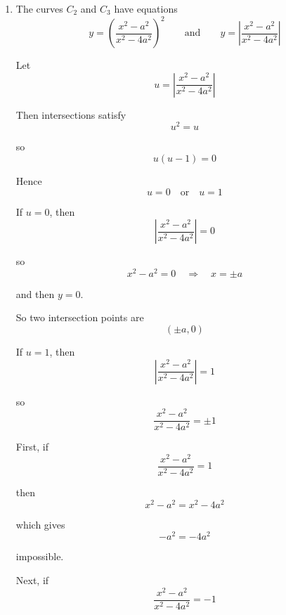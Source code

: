 \documentclass[leqno]{article}
\begin{document}
\begin{enumerate}[
  label=\textbf{\arabic*.},
  leftmargin=*,
  topsep=0pt,
  partopsep=0pt,
  parsep=0pt
]
\begin{djsSolution}
\begin{enumerate}[label=\textbf{(\alph*)}]
\begin{enumerate}[label=(\roman*)]
    So
    \begin{align*}
    g'(x)
    &=2\left(\frac{x^2-a^2}{x^2-4a^2}\right)\left(-\frac{6a^2x}{(x^2-4a^2)^2}\right) \\
    &=-\frac{12a^2x(x^2-a^2)}{(x^2-4a^2)^3}
    \end{align*}

    Stationary points occur when $g'(x)=0$, so
    \[
    -12a^2x(x^2-a^2)=0
    \]

    Hence
    \[
    x=0 \quad \text{or} \quad x^2=a^2\quad\Longrightarrow\quad x=\pm a
    \]

    Now find the corresponding $y$-coordinates:
    \[
    g(0)=\left(\frac{-a^2}{-4a^2}\right)^2=\left(\frac14\right)^2=\frac1{16}
    \]

    and
    \[
    g(\pm a)=0
    \]

    Therefore the stationary points are
    \[
    \left(0,\frac{1}{16}\right),\quad (-a,0),\quad (a,0)
    \]

    \item The curves $C_2$ and $C_3$ have equations
    \[
    y=\left(\frac{x^2-a^2}{x^2-4a^2}\right)^2
    \qquad \text{and} \qquad
    y=\left|\frac{x^2-a^2}{x^2-4a^2}\right|
    \]

    Let
    \[
    u=\left|\frac{x^2-a^2}{x^2-4a^2}\right|
    \]

    Then intersections satisfy
    \[
    u^2=u
    \]

    so
    \[
    u(u-1)=0
    \]

    Hence
    \[
    u=0 \quad \text{or} \quad u=1
    \]

    If $u=0$, then
    \[
    \left|\frac{x^2-a^2}{x^2-4a^2}\right|=0
    \]

    so
    \[
    x^2-a^2=0\quad\Longrightarrow\quad x=\pm a
    \]

    and then $y=0$.

    So two intersection points are
    \[
    (\pm a,0)
    \]

    If $u=1$, then
    \[
    \left|\frac{x^2-a^2}{x^2-4a^2}\right|=1
    \]

    so
    \[
    \frac{x^2-a^2}{x^2-4a^2}=\pm 1
    \]

    First, if
    \[
    \frac{x^2-a^2}{x^2-4a^2}=1
    \]

    then
    \[
    x^2-a^2=x^2-4a^2
    \]

    which gives
    \[
    -a^2=-4a^2
    \]

    impossible.

    Next, if
    \[
    \frac{x^2-a^2}{x^2-4a^2}=-1
    \]


\end{enumerate}
\end{enumerate}
\end{djsSolution}
\end{enumerate}
\end{document}
